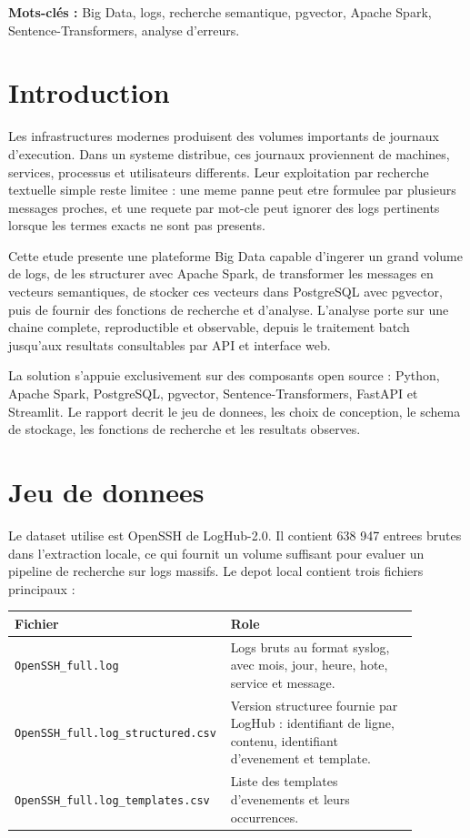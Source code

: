 \documentclass[12pt,a4paper]{article}
\begin{document}
\textbf{Mots-clés :} Big Data, logs, recherche semantique, pgvector, Apache Spark,
Sentence-Transformers, analyse d'erreurs.

\section{Introduction}

Les infrastructures modernes produisent des volumes importants de journaux d'execution. Dans un
systeme distribue, ces journaux proviennent de machines, services, processus et utilisateurs
differents. Leur exploitation par recherche textuelle simple reste limitee : une meme panne peut
etre formulee par plusieurs messages proches, et une requete par mot-cle peut ignorer des logs
pertinents lorsque les termes exacts ne sont pas presents.

Cette etude presente une plateforme Big Data capable d'ingerer un grand volume de logs, de les
structurer avec Apache Spark, de transformer les messages en vecteurs semantiques, de stocker ces
vecteurs dans PostgreSQL avec pgvector, puis de fournir des fonctions de recherche et d'analyse.
L'analyse porte sur une chaine complete, reproductible et observable, depuis le traitement batch
jusqu'aux resultats consultables par API et interface web.

La solution s'appuie exclusivement sur des composants open source : Python, Apache Spark,
PostgreSQL, pgvector, Sentence-Transformers, FastAPI et Streamlit. Le rapport decrit le jeu de
donnees, les choix de conception, le schema de stockage, les fonctions de recherche et les resultats
observes.

\section{Jeu de donnees}

Le dataset utilise est OpenSSH de LogHub-2.0. Il contient 638 947 entrees brutes dans l'extraction
locale, ce qui fournit un volume suffisant pour evaluer un pipeline de recherche sur logs massifs.
Le depot local contient trois fichiers principaux :

\begin{longtable}{p{0.42\linewidth}p{0.46\linewidth}}
\toprule
Fichier & Role\\
\midrule
\texttt{OpenSSH\_full.log} & Logs bruts au format syslog, avec mois, jour, heure, hote, service et message.\\
\texttt{OpenSSH\_full.log\_structured.csv} & Version structuree fournie par LogHub : identifiant de ligne, contenu, identifiant d'evenement et template.\\
\texttt{OpenSSH\_full.log\_templates.csv} & Liste des templates d'evenements et leurs occurrences.\\
\bottomrule
\end{longtable}
\end{document}

